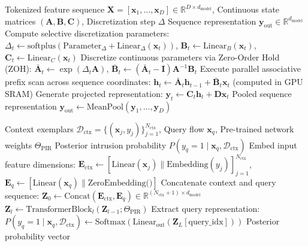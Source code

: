 \documentclass[10pt,a4paper]{article}
\begin{document}
\begin{algorithm}[!ht]
\caption{Mambular SSM Hardware-Aware Discretized State Space Scan}
\label{alg:mambular}
\begin{algorithmic}[1]
\REQUIRE Tokenized feature sequence $\mathbf{X} = [\mathbf{x}_1, \dots, \mathbf{x}_D] \in \mathbb{R}^{D \times d_{\text{model}}}$, Continuous state matrices $(\mathbf{A}, \mathbf{B}, \mathbf{C})$, Discretization step $\Delta$
\ENSURE Sequence representation $\mathbf{y}_{\text{out}} \in \mathbb{R}^{d_{\text{model}}}$
\STATE Compute selective discretization parameters: $\Delta_t \leftarrow \text{softplus}(\text{Parameter}_\Delta + \text{Linear}_\Delta(\mathbf{x}_t))$, $\mathbf{B}_t \leftarrow \text{Linear}_B(\mathbf{x}_t)$, $\mathbf{C}_t \leftarrow \text{Linear}_C(\mathbf{x}_t)$
\STATE Discretize continuous parameters via Zero-Order Hold (ZOH): $\bar{\mathbf{A}}_t \leftarrow \exp(\Delta_t \mathbf{A})$, $\bar{\mathbf{B}}_t \leftarrow (\bar{\mathbf{A}}_t - \mathbf{I})\mathbf{A}^{-1}\mathbf{B}_t$
\STATE Execute parallel associative prefix scan across sequence coordinates: $\mathbf{h}_t \leftarrow \bar{\mathbf{A}}_t \mathbf{h}_{t-1} + \bar{\mathbf{B}}_t \mathbf{x}_t$ (computed in GPU SRAM)
\STATE Generate projected representation: $\mathbf{y}_t \leftarrow \mathbf{C}_t \mathbf{h}_t + \mathbf{D}\mathbf{x}_t$
\RETURN Pooled sequence representation $\mathbf{y}_{\text{out}} \leftarrow \text{MeanPool}(\mathbf{y}_1, \dots, \mathbf{y}_D)$
\end{algorithmic}
\end{algorithm}

\begin{algorithm}[!ht]
\caption{TabPFN Prior-Data Fitted In-Context Bayesian Inference}
\label{alg:tabpfn}
\begin{algorithmic}[1]
\REQUIRE Context exemplars $\mathcal{D}_{\text{ctx}} = \{(\mathbf{x}_j, y_j)\}_{j=1}^{N_{\text{ctx}}}$, Query flow $\mathbf{x}_q$, Pre-trained network weights $\Theta_{\text{PIR}}$
\ENSURE Posterior intrusion probability $P(y_q = 1 \mid \mathbf{x}_q, \mathcal{D}_{\text{ctx}})$
\STATE Embed input feature dimensions: $\mathbf{E}_{\text{ctx}} \leftarrow [\text{Linear}(\mathbf{x}_j) \parallel \text{Embedding}(y_j)]_{j=1}^{N_{\text{ctx}}}$, $\mathbf{E}_q \leftarrow [\text{Linear}(\mathbf{x}_q) \parallel \text{ZeroEmbedding()}]$
\STATE Concatenate context and query sequence: $\mathbf{Z}_0 \leftarrow \text{Concat}(\mathbf{E}_{\text{ctx}}, \mathbf{E}_q) \in \mathbb{R}^{(N_{\text{ctx}} + 1) \times d_{\text{model}}}$
    \STATE $\mathbf{Z}_l \leftarrow \text{TransformerBlock}_l(\mathbf{Z}_{l-1}; \Theta_{\text{PIR}})$
\ENDFOR
\STATE Extract query representation: $P(y_q = 1 \mid \mathbf{x}_q, \mathcal{D}_{\text{ctx}}) \leftarrow \text{Softmax}(\text{Linear}_{\text{out}}(\mathbf{Z}_L[\text{query\_idx}]))$
\RETURN Posterior probability vector
\end{algorithmic}
\end{algorithm}
\end{document}
